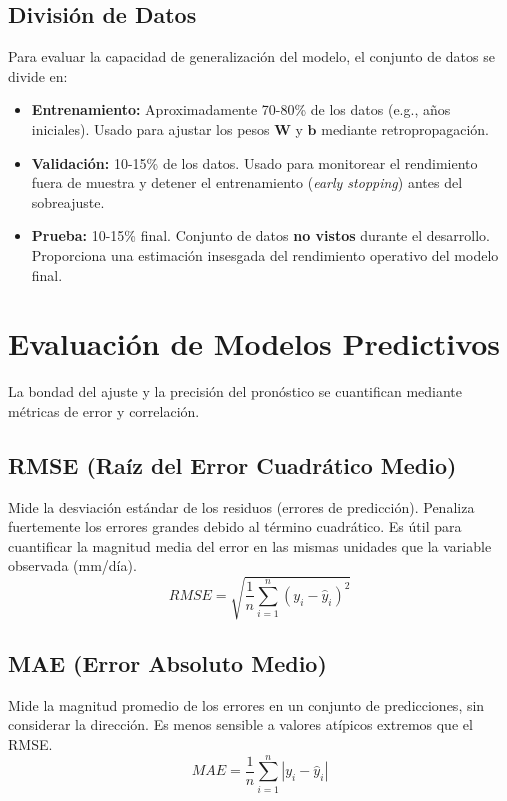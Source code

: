 \documentclass[titlepage,11pt]{report}
\begin{document}
\subsection{División de Datos}
Para evaluar la capacidad de generalización del modelo, el conjunto de datos se divide en:
\begin{itemize}
    \item \textbf{Entrenamiento:} Aproximadamente 70-80\% de los datos (e.g., años iniciales). Usado para ajustar los pesos \(\mathbf{W}\) y \(\mathbf{b}\) mediante retropropagación.
    \item \textbf{Validación:} 10-15\% de los datos. Usado para monitorear el rendimiento fuera de muestra y detener el entrenamiento (\textit{early stopping}) antes del sobreajuste.
    \item \textbf{Prueba:} 10-15\% final. Conjunto de datos \textbf{no vistos} durante el desarrollo. Proporciona una estimación insesgada del rendimiento operativo del modelo final.
\end{itemize}

\section{Evaluación de Modelos Predictivos}

La bondad del ajuste y la precisión del pronóstico se cuantifican mediante métricas de error y correlación.

\subsection{RMSE (Raíz del Error Cuadrático Medio)}
Mide la desviación estándar de los residuos (errores de predicción). Penaliza fuertemente los errores grandes debido al término cuadrático. Es útil para cuantificar la magnitud media del error en las mismas unidades que la variable observada (mm/día).
\begin{equation}
    RMSE = \sqrt{\frac{1}{n} \sum_{i=1}^{n} (y_i - \hat{y}_i)^2}
\end{equation}

\subsection{MAE (Error Absoluto Medio)}
Mide la magnitud promedio de los errores en un conjunto de predicciones, sin considerar la dirección. Es menos sensible a valores atípicos extremos que el RMSE.
\begin{equation}
    MAE = \frac{1}{n} \sum_{i=1}^{n} |y_i - \hat{y}_i|
\end{equation}
\end{document}
